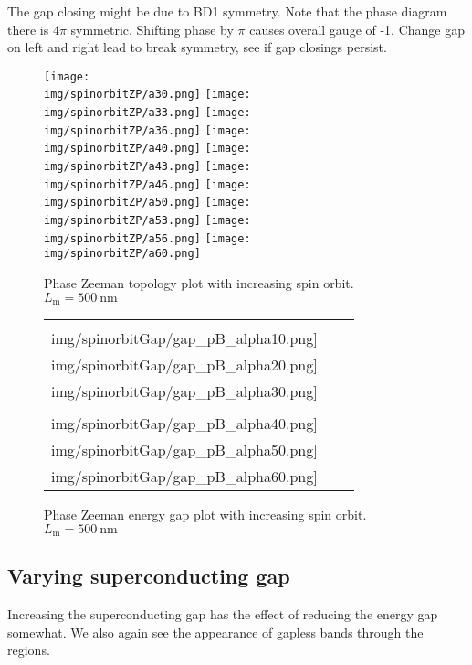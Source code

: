 \documentclass[10pt,a4paper]{article}
\newcommand{\img}{./images}
\begin{document}
	The gap closing might be due to BD1 symmetry. Note that the phase diagram there is $4\pi$ symmetric. Shifting phase by $\pi$ causes overall gauge of -1. Change gap on left and right lead to break symmetry, see if gap closings persist.
	

		\begin{figure}[H]
			\texttt{[image: \\img/spinorbitZP/a30.png]}
			\texttt{[image: \\img/spinorbitZP/a33.png]}
			\texttt{[image: \\img/spinorbitZP/a36.png]}
			\texttt{[image: \\img/spinorbitZP/a40.png]}
			\texttt{[image: \\img/spinorbitZP/a43.png]}
			\texttt{[image: \\img/spinorbitZP/a46.png]}
			\texttt{[image: \\img/spinorbitZP/a50.png]}
			\texttt{[image: \\img/spinorbitZP/a53.png]}
			\texttt{[image: \\img/spinorbitZP/a56.png]}
			\texttt{[image: \\img/spinorbitZP/a60.png]}
			\caption{Phase Zeeman topology plot with increasing spin orbit. $L_\text{m}=\SI{500}{\nm}$}
			\label{fig:pfaf_pB_soi}
		\end{figure}
	
		\begin{figure}[H]
			\begin{tabular}{ccc}
				\texttt{[image: \\img/spinorbitGap/gap\_pB\_alpha10.png]}&
				\texttt{[image: \\img/spinorbitGap/gap\_pB\_alpha20.png]}&
				\texttt{[image: \\img/spinorbitGap/gap\_pB\_alpha30.png]}\\
				\texttt{[image: \\img/spinorbitGap/gap\_pB\_alpha40.png]}&
				\texttt{[image: \\img/spinorbitGap/gap\_pB\_alpha50.png]}&
				\texttt{[image: \\img/spinorbitGap/gap\_pB\_alpha60.png]}\\
			\end{tabular}
			\caption{Phase Zeeman energy gap plot with increasing spin orbit. $L_\text{m}=\SI{500}{\nm}$}
			\label{fig:gap_pB_soi}
		\end{figure}
\newpage	
	\subsection{Varying superconducting gap}
	Increasing the superconducting gap has the effect of reducing the energy gap somewhat.
	We also again see the appearance of gapless bands through the regions.
	
\end{document}
